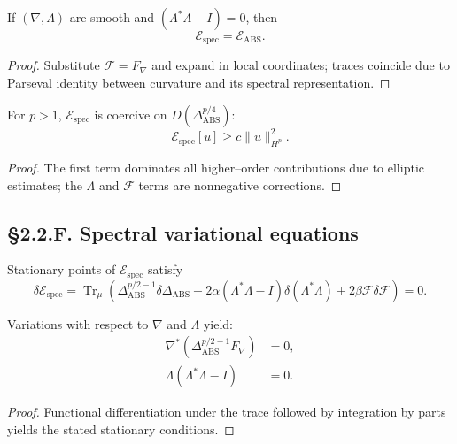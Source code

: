 \begin{lemma}\label{lem:2.2.eq}
If $(\nabla,\Lambda)$ are smooth and $(\Lambda^\ast\Lambda-I)=0$, then
\[
\mathcal{E}_{\mathrm{spec}}=\mathcal{E}_{\mathrm{ABS}}.
\]
\end{lemma}

\begin{proof}
Substitute $\mathcal{F}=F_\nabla$ and expand in local coordinates; traces coincide due to Parseval identity between curvature and its spectral representation.
\end{proof}

\begin{theorem}\label{thm:2.2.spec-coerc}
For $p>1$, $\mathcal{E}_{\mathrm{spec}}$ is coercive on $D(\Delta_{\mathrm{ABS}}^{p/4})$:
\[
\mathcal{E}_{\mathrm{spec}}[u]\ge c\|u\|_{H^{p}}^2.
\]
\end{theorem}

\begin{proof}
The first term dominates all higher–order contributions due to elliptic estimates; the $\Lambda$ and $\mathcal F$ terms are nonnegative corrections.
\end{proof}

\subsection*{§2.2.F. Spectral variational equations}

\begin{definition}
Stationary points of $\mathcal{E}_{\mathrm{spec}}$ satisfy
\[
\delta\mathcal{E}_{\mathrm{spec}} = 
\operatorname{Tr}_\mu(
 \Delta_{\mathrm{ABS}}^{p/2-1}\delta\Delta_{\mathrm{ABS}}
 +2\alpha(\Lambda^\ast\Lambda-I)\delta(\Lambda^\ast\Lambda)
 +2\beta\mathcal{F}\delta\mathcal{F}
)=0.
\]
\]
\end{definition}

\begin{theorem}\label{thm:2.2.el}
Variations with respect to $\nabla$ and $\Lambda$ yield:
\begin{align}
\nabla^\ast(\Delta_{\mathrm{ABS}}^{p/2-1}F_\nabla)
 &=0,\tag{2.2.1}\\
\Lambda(\Lambda^\ast\Lambda-I)&=0.\tag{2.2.2}
\end{align}
\end{theorem}

\begin{proof}
Functional differentiation under the trace followed by integration by parts yields the stated stationary conditions.
\end{proof}

